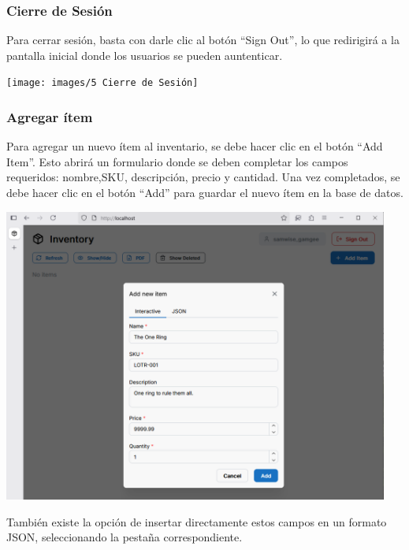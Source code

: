 \subsubsection{Cierre de Sesión}

Para cerrar sesión, basta con darle clic al botón “Sign Out”, lo que redirigirá a la pantalla inicial donde los usuarios se pueden auntenticar.

\begin{center}
\texttt{[image: images/5 Cierre de Sesión]}
\end{center}

\subsubsection{Agregar ítem}

Para agregar un nuevo ítem al inventario, se debe hacer clic en el botón “Add Item”. Esto abrirá un formulario donde se deben completar los campos requeridos: nombre,SKU, descripción, precio y cantidad. Una vez completados, se debe hacer clic en el botón “Add” para guardar el nuevo ítem en la base de datos.

\begin{center}
\includegraphics[width=0.95\textwidth]{images/6 Agregar}
\end{center}

También existe la opción de insertar directamente estos campos en un formato JSON, seleccionando la pestaña correspondiente.

